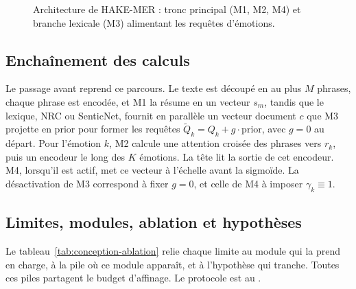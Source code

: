 \begin{figure}[H]
{}
\caption{Architecture de HAKE-MER : tronc principal (M1, M2, M4)
et branche lexicale (M3) alimentant les requêtes d'émotions.}
\label{fig:hakemer-archi}
\end{figure}

\subsection{Enchaînement des calculs}
\label{sec:conception-forward}

Le passage avant reprend ce parcours. Le texte est découpé en au plus
$M$ phrases, chaque phrase est encodée, et M1 la résume en un vecteur
$s_m$, tandis que le lexique, NRC ou SenticNet, fournit en parallèle un
vecteur document $c$ que M3 projette en $\mathrm{prior}$ pour former les
requêtes $\tilde{Q}_k = Q_k + g\cdot\mathrm{prior}$, avec $g{=}0$ au
départ. Pour l'émotion $k$, M2 calcule une attention croisée des phrases
vers $r_k$, puis un encodeur le long des $K$ émotions. La tête lit la
sortie de cet encodeur. M4, lorsqu'il est actif, met ce vecteur à
l'échelle avant la sigmoïde. La désactivation de M3 correspond à fixer
$g{=}0$, et celle de M4 à imposer $\gamma_k \equiv 1$.

\subsection{Limites, modules, ablation et hypothèses}
\label{sec:conception-synthese}

Le tableau~\ref{tab:conception-ablation} relie chaque limite au module
qui la prend en charge, à la pile où ce module apparaît, et à
l'hypothèse qui tranche. Toutes ces piles partagent le budget
d'affinage. Le protocole est au .

